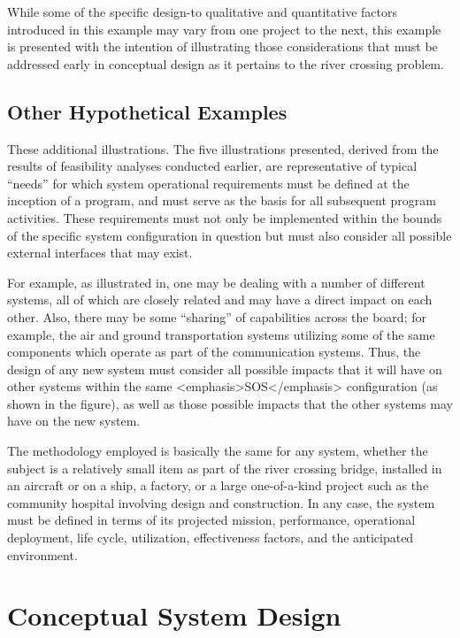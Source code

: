 While some of the specific design-to qualitative and quantitative factors introduced in this example may vary from one project to the next, this example is presented with the intention of illustrating those considerations that must be addressed early in conceptual design as it pertains to the river crossing problem.
    
\subsection{Other Hypothetical Examples}


These additional illustrations. The five illustrations presented, derived from the results of feasibility analyses conducted earlier, are representative of typical ``needs'' for which system operational requirements must be defined at the inception of a program, and must serve as the basis for all subsequent program activities. These requirements must not only be implemented within the bounds of the specific system configuration in question but must also consider all possible external interfaces that may exist.

For example, as illustrated in, one may be dealing with a number of different systems, all of which are closely related and may have a direct impact on each other. Also, there may be some ``sharing'' of capabilities across the board; for example, the air and ground transportation systems utilizing some of the same components which operate as part of the communication systems. Thus, the design of any new system must consider all possible impacts that it will have on other systems within the same <emphasis>SOS</emphasis> configuration (as shown in the figure), as well as those possible impacts that the other systems may have on the new system.

The methodology employed is basically the same for any system, whether the subject is a relatively small item as part of the river crossing bridge, installed in an aircraft or on a ship, a factory, or a large one-of-a-kind project such as the community hospital involving design and construction. In any case, the system must be defined in terms of its projected mission, performance, operational deployment, life cycle, utilization, effectiveness factors, and the anticipated environment.
    

\section{Conceptual System Design}


